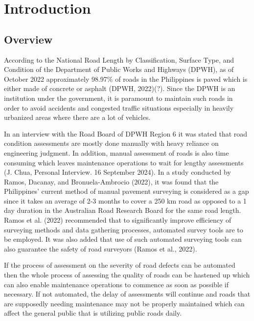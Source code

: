 \documentclass{report} %
\begin{document}
	
	\chapter{Introduction}
	\label{sec:researchdesc}    %
	
	\section{Overview}
	\label{sec:overview}
	According to the National Road Length by Classification, Surface Type, and Condition of the Department of Public Works and Highways (DPWH), as of October 2022 approximately 98.97\% of roads in the Philippines is paved which is either made of concrete or asphalt (DPWH, 2022)(?). Since the DPWH is an institution under the government, it is paramount to maintain such roads in order to avoid accidents and congested traffic situations especially in heavily urbanized areas where there are a lot of vehicles.
	
	
	In an interview with the Road Board of DPWH Region 6 it was stated that road condition assessments are mostly done manually with heavy reliance on engineering judgment. In addition, manual assessment of roads is also time consuming which leaves maintenance operations to wait for lengthy assessments (J. Chua, Personal Interview. 16 September 2024).  In a study conducted by Ramos, Dacanay, and Bronuela-Ambrocio (2022), it was found that the Philippines’ current method of manual pavement surveying is considered as a gap since it takes an average of 2-3 months to cover a 250 km road as opposed to a 1 day duration in the Australian Road Research Board for the same road length. Ramos et al. (2022) recommended that to significantly improve efficiency of surveying methods and data gathering processes, automated survey tools are to be employed. It was also added that use of such automated surveying tools can also guarantee the safety of road surveyors (Ramos et al., 2022).
	
	
	If the process of assessment on the severity of road defects can be automated then the whole process of assessing the quality of roads can be hastened up which can also enable maintenance operations to commence as soon as possible if necessary. If not automated, the delay of assessments will continue and roads that are supposedly needing maintenance may not be properly maintained which can affect the general public that is utilizing public roads daily.
	
	
\end{document}
